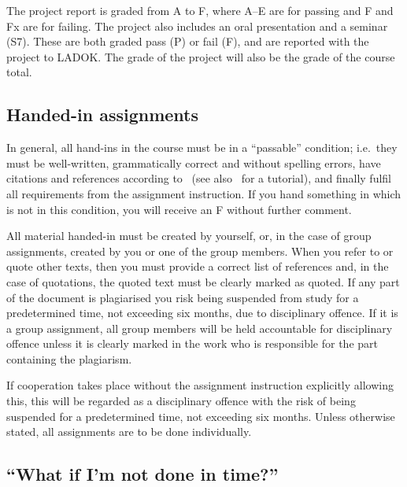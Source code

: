 The project report is graded from A to F, where A--E are for passing and F and 
Fx are for failing.
The project also includes an oral presentation and a seminar (S7).
These are both graded pass (P) or fail (F), and are reported with the project 
to LADOK\@.
The grade of the project will also be the grade of the course total.

\subsection{Handed-in assignments}

In general, all hand-ins in the course must be in a \enquote{passable} 
condition; i.e.~they must be well-written, grammatically correct and without 
spelling errors, have citations and references according to~\cite{IEEEcitation} 
(see also~\cite{PurdueCitation} for a tutorial), and finally fulfil all 
requirements from the assignment instruction.
If you hand something in which is not in this condition, you will receive an 
F without further comment.

All material handed-in must be created by yourself, or, in the case of group 
assignments, created by you or one of the group members.
When you refer to or quote other texts, then you must provide a correct list of 
references and, in the case of quotations, the quoted text must be clearly 
marked as quoted.
If any part of the document is plagiarised you risk being suspended from study 
for a predetermined time, not exceeding six months, due to disciplinary 
offence.
If it is a group assignment, all group members will be held accountable for 
disciplinary offence unless it is clearly marked in the work who is responsible 
for the part containing the plagiarism.

If cooperation takes place without the assignment instruction explicitly 
allowing this, this will be regarded as a disciplinary offence with the risk of
being suspended for a predetermined time, not exceeding six months.
Unless otherwise stated, all assignments are to be done individually.

\subsection{\enquote{What if I'm not done in time?}}
\label{sec:late}



\printbibliography{}
